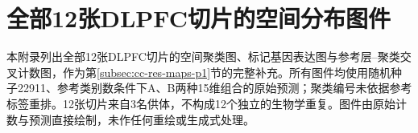 \section{全部12张DLPFC切片的空间分布图件}
\label{sec:cc-e4-appendix-v1}
本附录列出全部12张DLPFC切片的空间聚类图、标记基因表达图与参考层--聚类交叉计数图，作为第\ref{subsec:cc-res-maps-p1}节的完整补充。所有图件均使用随机种子22911、参考类别数条件下A、B两种15维组合的原始预测；聚类编号未依据参考标签重排。12张切片来自3名供体，不构成12个独立的生物学重复。图件由原始计数与预测直接绘制，未作任何重绘或生成式处理。

